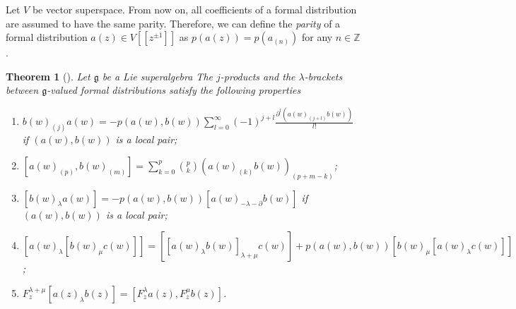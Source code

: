 \documentclass[a4paper, 12pt, reqno]{amsart}
\newtheorem{theorem}{Theorem}[subsection]
\theoremstyle{remark}
\numberwithin{equation}{subsection}
\begin{document}
Let $V$ be vector superspace.
From now on, all coefficients of a formal distribution are assumed to have the same parity.
Therefore, we can define the \emph{parity} of a formal distribution $a(z) \in V[[z^{\pm 1}]]$ as $p(a(z)) = p(a_{(n)})$ for any $n \in \mathbb{Z}$.

\begin{theorem}[{\cite[Section 2.3]{nozaradan_introduction_2008}}]
  \label{thr:3}
  Let $\mathfrak{g}$ be a Lie superalgebra
  The $j$-products and the $\lambda$-brackets between $\mathfrak{g}$-valued formal distributions satisfy the following properties
  \begin{enumerate}[label = (\alph*)]
  \item $b(w)_{(j)}a(w) = -p(a(w), b(w))\sum_{l = 0}^{\infty}(-1)^{j + l}\frac{\partial^l(a(w)_{(j + l)}b(w))}{l!}$ if $(a(w), b(w))$ is a local pair;
  \item $[a(w)_{(p)}, b(w)_{(m)}] = \sum_{k = 0}^p\binom{p}{k}(a(w)_{(k)}b(w))_{(p + m - k)}$;
  \item $[b(w)_{\lambda}a(w)] = -p(a(w), b(w))[a(w)_{-\lambda - \partial}b(w)]$ if $(a(w), b(w))$ is a local pair;
  \item $[a(w)_{\lambda}[b(w)_{\mu}c(w)]] = [[a(w)_{\lambda}b(w)]_{\lambda + \mu}c(w)] + p(a(w), b(w))[b(w)_{\mu}[a(w)_{\lambda}c(w)]]$;
  \item $F^{\lambda + \mu}_z[a(z)_{\lambda}b(z)] = [F^{\lambda}_za(z), F^{\mu}_zb(z)]$.
  \end{enumerate}
\end{theorem}
\end{document}
